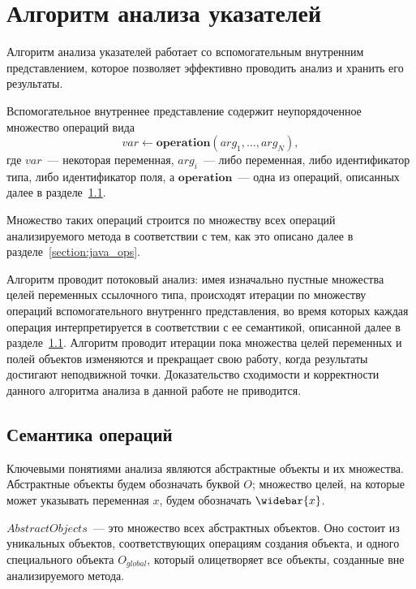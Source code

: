 \documentclass[14pt,titlepage,draft]{extarticle}
\newcommand{\op}[1]{\mathbf{#1}}
\newcommand{\pts}[1]{\widebar{#1}}
\begin{document}
  \section{Алгоритм анализа указателей}

    Алгоритм анализа указателей работает со вспомогательным внутренним
    представлением, которое позволяет эффективно проводить анализ и хранить его
    результаты.

    Вспомогательное внутреннее представление содержит неупорядоченное множество
    операций вида
    \[ var \gets \op{operation}(arg_1, \ldots, arg_N), \]
    где $var$~--- некоторая переменная, $arg_i$~--- либо переменная, либо
    идентификатор типа, либо идентификатор поля, а $\op{operation}$~--- одна из
    операций, описанных далее в разделе~\ref{section:ops_semantic}.

    Множество таких операций строится по множеству всех операций
    анализируемого метода в соответствии с тем, как это описано далее в
    разделе~\ref{section:java_ops}.

    Алгоритм проводит потоковый анализ: имея изначально пустные
    множества целей переменных ссылочного типа, происходят итерации по
    множеству операций вспомогательного внутреннго представления, во время
    которых каждая операция интерпретируется в соответствии с ее семантикой,
    описанной далее в разделе~\ref{section:ops_semantic}. Алгоритм проводит
    итерации пока множества целей переменных и полей объектов изменяются и
    прекращает свою работу, когда результаты достигают неподвижной точки.
    Доказательство сходимости и корректности данного алгоритма анализа в данной
    работе не приводится.


    \subsection{Семантика операций}
      \label{section:ops_semantic}

      Ключевыми понятиями анализа являются абстрактные объекты и их множества.
      Абстрактные объекты будем обозначать буквой $O$; множество целей, на
      которые может указывать переменная $x$, будем обозначать $\pts{x}$.

      $AbstractObjects$~--- это множество всех абстрактных объектов. Оно
      состоит из уникальных объектов, соответствующих операциям создания
      объекта, и одного специального объекта $O_{global}$, который олицетворяет
      все объекты, созданные вне анализируемого метода.
\end{document}
